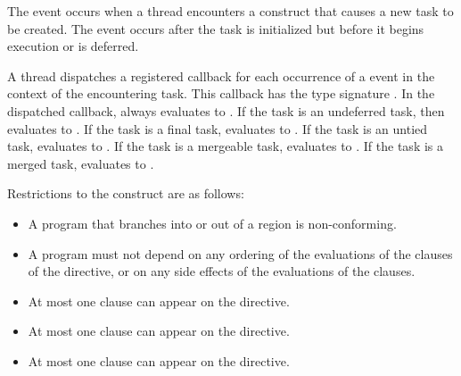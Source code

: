 \events

The  event occurs when a thread encounters a construct
that causes a new task to be created.
The event occurs after the task is initialized but before
it begins execution or is deferred.

\tools

A thread dispatches a registered 
callback for each occurrence of a  event
in the context of the encountering task.
This callback has the type signature .
In the dispatched callback,  always
evaluates to .
If the task is an undeferred task, then  evaluates to .
If the task is a final task,  evaluates to .
If the task is an untied task,  evaluates to .
If the task is a mergeable task,  evaluates to .
If the task is a merged task,  evaluates to .

\restrictions
Restrictions to the  construct are as follows:

\begin{itemize}
\item A program that branches into or out of a  region is non-conforming.

\item A program must not depend on any ordering of the evaluations of the clauses of the
 directive, or on any side effects of the evaluations of the clauses.

\item At most one  clause can appear on the directive.

\item At most one  clause can appear on the directive.

\item At most one  clause can appear on the directive.


\end{itemize}

